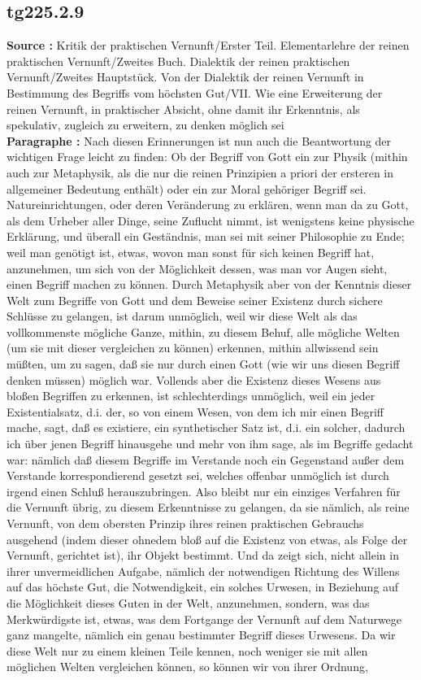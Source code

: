 \documentclass[a4paper,12pt,twoside]{book}
\begin{document}
	\subsection*{tg225.2.9} 
	\textbf{Source : }Kritik der praktischen Vernunft/Erster Teil. Elementarlehre der reinen praktischen Vernunft/Zweites Buch. Dialektik der reinen praktischen Vernunft/Zweites Hauptstück. Von der Dialektik der reinen Vernunft in Bestimmung des Begriffs vom höchsten Gut/VII. Wie eine Erweiterung der reinen Vernunft, in praktischer Absicht, ohne damit ihr Erkenntnis, als spekulativ, zugleich zu erweitern, zu denken möglich sei\\  
	
	\noindent\textbf{Paragraphe : }Nach diesen Erinnerungen ist nun auch die Beantwortung der wichtigen Frage leicht zu finden: Ob der Begriff von Gott ein zur Physik (mithin auch zur Metaphysik, als die nur die reinen Prinzipien a priori der ersteren in allgemeiner  Bedeutung enthält) oder ein zur Moral gehöriger Begriff sei. Natureinrichtungen, oder deren Veränderung zu erklären, wenn man da zu Gott, als dem Urheber aller Dinge, seine Zuflucht nimmt, ist wenigstens keine physische Erklärung, und überall ein Geständnis, man sei mit seiner Philosophie zu Ende; weil man genötigt ist, etwas, wovon man sonst für sich keinen Begriff hat, anzunehmen, um sich von der Möglichkeit dessen, was man vor Augen sieht, einen Begriff machen zu können. Durch Metaphysik aber von der Kenntnis dieser Welt zum Begriffe von Gott und dem Beweise seiner Existenz durch sichere Schlüsse zu gelangen, ist darum unmöglich, weil wir diese Welt als das vollkommenste mögliche Ganze, mithin, zu diesem Behuf, alle mögliche Welten (um sie mit dieser vergleichen zu können) erkennen, mithin allwissend sein müßten, um zu sagen, daß sie nur durch einen Gott (wie wir uns diesen Begriff denken müssen) möglich war. Vollends aber die Existenz dieses Wesens aus bloßen Begriffen zu erkennen, ist schlechterdings unmöglich, weil ein jeder Existentialsatz, d.i. der, so von einem Wesen, von dem ich mir einen Begriff mache, sagt, daß es existiere, ein synthetischer Satz ist, d.i. ein solcher, dadurch ich über jenen Begriff hinausgehe und mehr von ihm sage, als im Begriffe gedacht war: nämlich daß diesem Begriffe im Verstande noch ein Gegenstand außer dem Verstande korrespondierend gesetzt sei, welches offenbar unmöglich ist durch irgend einen Schluß herauszubringen. Also bleibt nur ein einziges Verfahren für die Vernunft übrig, zu diesem Erkenntnisse zu gelangen, da sie nämlich, als reine Vernunft, von dem obersten Prinzip ihres reinen praktischen Gebrauchs ausgehend (indem dieser ohnedem bloß auf die Existenz von etwas, als Folge der Vernunft, gerichtet ist), ihr Objekt bestimmt. Und da zeigt sich, nicht allein in ihrer unvermeidlichen Aufgabe, nämlich der notwendigen Richtung des Willens auf das höchste Gut, die Notwendigkeit, ein solches Urwesen, in Beziehung auf die Möglichkeit dieses Guten in der Welt, anzunehmen, sondern, was das Merkwürdigste ist, etwas, was dem Fortgange der Vernunft auf dem Naturwege ganz  mangelte, nämlich ein genau bestimmter Begriff dieses Urwesens. Da wir diese Welt nur zu einem kleinen Teile kennen, noch weniger sie mit allen möglichen Welten vergleichen können, so können wir von ihrer Ordnung, 
\end{document}
